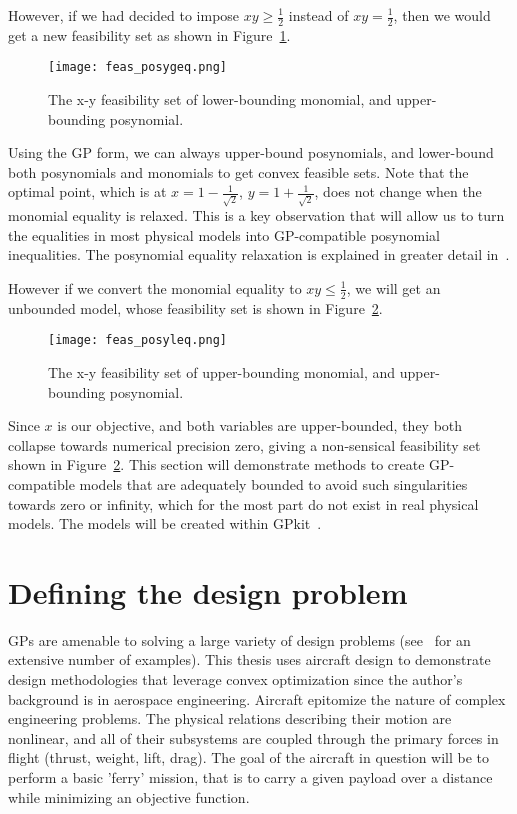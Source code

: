 However, if we had decided to impose $xy \geq \frac{1}{2}$ instead of $xy = \frac{1}{2}$,
then we would get a new feasibility set as shown in Figure~\ref{f:feas_posygeq}.

\begin{figure}
    \centering
    \texttt{[image: feas\_posygeq.png]}
    \caption{The x-y feasibility set of lower-bounding monomial,
    and upper-bounding posynomial.}
    \label{f:feas_posygeq}
\end{figure}

Using the \gls{GP} form, we can always upper-bound posynomials, and lower-bound both posynomials
and monomials to get convex feasible sets. Note that the optimal point, which is at
$x = 1 - \frac{1}{\sqrt{2}}$, $y = 1 + \frac{1}{\sqrt{2}}$,
does not change when the monomial equality is relaxed. This is a key
observation that will allow us to turn the equalities in most physical models into \gls{GP}-compatible
posynomial inequalities. The posynomial equality relaxation is explained in greater detail
in~\cite{hoburg_thesis}.

However if we convert the monomial equality to  $xy \leq \frac{1}{2}$, we will get an unbounded model,
whose feasibility set is shown in Figure~\ref{f:feas_posyleq}.

\begin{figure}
    \centering
    \texttt{[image: feas\_posyleq.png]}
    \caption{The x-y feasibility set of upper-bounding monomial,
    and upper-bounding posynomial.}
    \label{f:feas_posyleq}
\end{figure}

Since $x$ is our objective, and both variables are upper-bounded, they both collapse towards numerical
precision zero,
giving a non-sensical feasibility set shown in Figure~\ref{f:feas_posyleq}. This section will
demonstrate methods to create \gls{GP}-compatible models that are adequately bounded to avoid such
singularities towards zero or infinity, which for the most part do not
exist in real physical models. The models will be created within GPkit~\cite{gpkit}.

\section{Defining the design problem}

\gls{GP}s are amenable to solving a large variety of design problems (see~\cite{gpintro} for an
extensive number of examples). This thesis uses aircraft design to demonstrate
design methodologies that leverage convex optimization since the author's background is in aerospace engineering.
Aircraft epitomize the nature of complex engineering problems. The physical 
relations describing their motion are nonlinear, and all of their subsystems are 
coupled through the primary forces in flight (thrust, weight, lift, drag).
The goal of the aircraft in question will be to perform a basic 'ferry' mission, that
is to carry a given payload
over a distance while minimizing an objective function.

